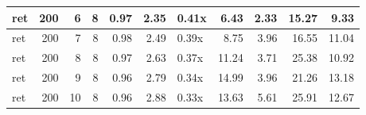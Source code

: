 \begin{table}[ht]
\begin{tabular}{lrrrrrlrrrr}
   \hline
ret & 200 &   6 &   8 & 0.97 & 2.35 & 0.41x & 6.43 & 2.33 & 15.27 & 9.33 \\ 
   \hline
ret & 200 &   7 &   8 & 0.98 & 2.49 & 0.39x & 8.75 & 3.96 & 16.55 & 11.04 \\ 
   \hline
ret & 200 &   8 &   8 & 0.97 & 2.63 & 0.37x & 11.24 & 3.71 & 25.38 & 10.92 \\ 
   \hline
ret & 200 &   9 &   8 & 0.96 & 2.79 & 0.34x & 14.99 & 3.96 & 21.26 & 13.18 \\ 
   \hline
ret & 200 &  10 &   8 & 0.96 & 2.88 & 0.33x & 13.63 & 5.61 & 25.91 & 12.67 \\ 
   \hline
\end{tabular}
\end{table}
